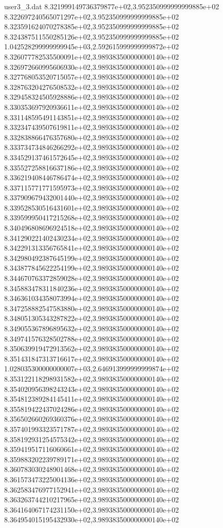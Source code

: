 \begin{filecontents}{user3_3.dat}
8.321999149736379877e+02,3.952350999999999885e+02
8.322697240565071297e+02,3.952350999999999885e+02
8.323591624070278385e+02,3.952350999999999885e+02
8.324387511550285126e+02,3.952350999999999885e+02
1.042528299999999945e+03,2.592615999999999872e+02
8.326077782535500091e+02,3.989383500000000140e+02
8.326972660995606930e+02,3.989383500000000140e+02
8.327768053520715057e+02,3.989383500000000140e+02
8.328763204276508532e+02,3.989383500000000140e+02
8.329458324505928886e+02,3.989383500000000140e+02
8.330353697920936611e+02,3.989383500000000140e+02
8.331148595491143851e+02,3.989383500000000140e+02
8.332347439507619811e+02,3.989383500000000140e+02
8.332838866476357680e+02,3.989383500000000140e+02
8.333734734846266292e+02,3.989383500000000140e+02
8.334529137461572645e+02,3.989383500000000140e+02
8.335527258816637186e+02,3.989383500000000140e+02
8.336219408446786474e+02,3.989383500000000140e+02
8.337115771771595973e+02,3.989383500000000140e+02
8.337909679432001440e+02,3.989383500000000140e+02
8.339528530516431601e+02,3.989383500000000140e+02
8.339599950417215268e+02,3.989383500000000140e+02
8.340496808696924518e+02,3.989383500000000140e+02
8.341290221402430234e+02,3.989383500000000140e+02
8.342291313356765841e+02,3.989383500000000140e+02
8.342980492387645199e+02,3.989383500000000140e+02
8.343877845622254199e+02,3.989383500000000140e+02
8.344670763372859028e+02,3.989383500000000140e+02
8.345883478311840236e+02,3.989383500000000140e+02
8.346361034358073994e+02,3.989383500000000140e+02
8.347258882547583880e+02,3.989383500000000140e+02
8.348051305343287822e+02,3.989383500000000140e+02
8.349055367896895632e+02,3.989383500000000140e+02
8.349741576328502788e+02,3.989383500000000140e+02
8.350639919472913562e+02,3.989383500000000140e+02
8.351431847313716617e+02,3.989383500000000140e+02
1.028035300000000007e+03,2.646913999999999874e+02
8.353122118298931582e+02,3.989383500000000140e+02
8.354020956398243243e+02,3.989383500000000140e+02
8.354812389284145411e+02,3.989383500000000140e+02
8.355819422437024286e+02,3.989383500000000140e+02
8.356502660269360376e+02,3.989383500000000140e+02
8.357401993323571787e+02,3.989383500000000140e+02
8.358192931254575342e+02,3.989383500000000140e+02
8.359419517116060661e+02,3.989383500000000140e+02
8.359883202239789171e+02,3.989383500000000140e+02
8.360783030248901468e+02,3.989383500000000140e+02
8.361573473225004136e+02,3.989383500000000140e+02
8.362583476977152941e+02,3.989383500000000140e+02
8.363263744210217965e+02,3.989383500000000140e+02
8.364164067174231150e+02,3.989383500000000140e+02
8.364954015195432930e+02,3.989383500000000140e+02

\end{filecontents}
